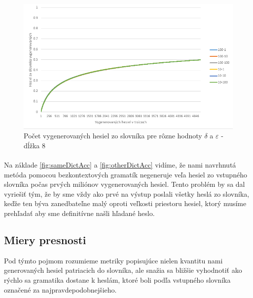 \begin{figure}[ht]
    \centering
    \includegraphics[width=1\textwidth]{sameDictAccMarkv2}
    \caption{Počet vygenerovaných hesiel zo slovníka pre rôzne hodnoty \(\delta\) a \(\varepsilon\) - dĺžka 8}
    \label{fig:MarkovV2}
\end{figure}

\paragraph{}
Na základe \ref{fig:sameDictAcc} a \ref{fig:otherDictAcc} vidíme, že nami navrhnutá metóda pomocou bezkontextových gramatík negeneruje veľa hesiel zo vstupného slovníka počas prvých miliónov vygenerovaných hesiel. Tento problém by sa dal vyriešiť tým, že by sme vždy ako prvé na výstup poslali všetky heslá zo slovníka, keďže ten býva zanedbateľne malý oproti veľkosti priestoru hesiel, ktorý musíme prehľadať aby sme definitívne našli hľadané heslo.

\subsection{Miery presnosti}
Pod týmto pojmom rozumieme metriky popisujúce nielen kvantitu nami generovaných hesiel patriacich do slovníka, ale snažia sa bližšie vyhodnotiť ako rýchlo sa gramatika dostane k heslám, ktoré boli podľa vstupného slovníka označené za najpravdepodobnejšieho.

